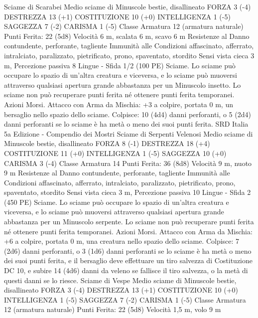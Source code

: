 \begin{multicols}{2}
Sciame di Scarabei
Medio sciame di Minuscole bestie, disallineato
FORZA 3 (-4)
DESTREZZA 13 (+1)
COSTITUZIONE 10 (+0)
INTELLIGENZA 1 (-5)
SAGGEZZA 7 (-2)
CARISMA 1 (-5)
Classe Armatura 12 (armatura naturale)
\hspace*{0pt}\hfill{Punti Ferita}: 22 (5d8)
Velocità 6 m, scalata 6 m, scavo 6 m
Resistenze al Danno contundente, perforante, tagliente
Immunità alle Condizioni affascinato, afferrato, intralciato,
paralizzato, pietrificato, prono, spaventato, stordito
Sensi vista cieca 3 m, Percezione passiva 8
Lingue -
Sfida 1/2 (100 PE)
Sciame. Lo sciame può occupare lo spazio di un’altra creatura e
viceversa, e lo sciame può muoversi attraverso qualsiasi apertura
grande abbastanza per un Minuscolo insetto. Lo sciame non può
recuperare punti ferita né ottenere punti ferita temporanei.
Azioni
Morsi. Attacco con Arma da Mischia: +3 a colpire, portata 0 m,
un bersaglio nello spazio dello sciame.
Colpisce: 10 (4d4) danni perforanti, o 5 (2d4) danni perforanti se
lo sciame è ha metà o meno dei suoi punti ferita.
SRD Italia 5a Edizione - Compendio dei Mostri
Sciame di Serpenti Velenosi
Medio sciame di Minuscole bestie, disallineato
FORZA 8 (-1)
DESTREZZA 18 (+4)
COSTITUZIONE 11 (+0)
INTELLIGENZA 1 (-5)
SAGGEZZA 10 (+0)
CARISMA 3 (-4)
Classe Armatura 14
\hspace*{0pt}\hfill{Punti Ferita}: 36 (8d8)
Velocità 9 m, nuoto 9 m
Resistenze al Danno contundente, perforante, tagliente
Immunità alle Condizioni affascinato, afferrato, intralciato,
paralizzato, pietrificato, prono, spaventato, stordito
Sensi vista cieca 3 m, Percezione passiva 10
Lingue -
Sfida 2 (450 PE)
Sciame. Lo sciame può occupare lo spazio di un’altra creatura e
viceversa, e lo sciame può muoversi attraverso qualsiasi apertura
grande abbastanza per un Minuscolo serpente. Lo sciame non
può recuperare punti ferita né ottenere punti ferita temporanei.
Azioni
Morsi. Attacco con Arma da Mischia: +6 a colpire, portata 0 m,
una creatura nello spazio dello sciame.
Colpisce: 7 (2d6) danni perforanti, o 3 (1d6) danni perforanti se
lo sciame è ha metà o meno dei suoi punti ferita, e il bersaglio
deve effettuare un tiro salvezza di Costituzione DC 10, e subire
14 (4d6) danni da veleno se fallisce il tiro salvezza, o la metà di
questi danni se lo riesce.
Sciame di Vespe
Medio sciame di Minuscole bestie, disallineato
FORZA 3 (-4)
DESTREZZA 13 (+1)
COSTITUZIONE 10 (+0)
INTELLIGENZA 1 (-5)
SAGGEZZA 7 (-2)
CARISMA 1 (-5)
Classe Armatura 12 (armatura naturale)
\hspace*{0pt}\hfill{Punti Ferita}: 22 (5d8)
Velocità 1,5 m, volo 9 m

\end{multicols}
